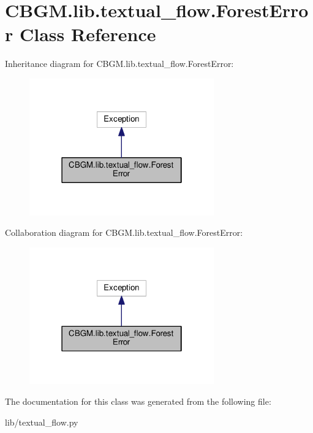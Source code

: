 \hypertarget{classCBGM_1_1lib_1_1textual__flow_1_1ForestError}{}\section{C\+B\+G\+M.\+lib.\+textual\+\_\+flow.\+Forest\+Error Class Reference}
\label{classCBGM_1_1lib_1_1textual__flow_1_1ForestError}


Inheritance diagram for C\+B\+G\+M.\+lib.\+textual\+\_\+flow.\+Forest\+Error\+:\nopagebreak
\begin{figure}[H]
\begin{center}
\leavevmode
\includegraphics[width=226pt]{classCBGM_1_1lib_1_1textual__flow_1_1ForestError__inherit__graph}
\end{center}
\end{figure}


Collaboration diagram for C\+B\+G\+M.\+lib.\+textual\+\_\+flow.\+Forest\+Error\+:\nopagebreak
\begin{figure}[H]
\begin{center}
\leavevmode
\includegraphics[width=226pt]{classCBGM_1_1lib_1_1textual__flow_1_1ForestError__coll__graph}
\end{center}
\end{figure}


The documentation for this class was generated from the following file\+:\begin{DoxyCompactItemize}
\item 
lib/textual\+\_\+flow.\+py\end{DoxyCompactItemize}
